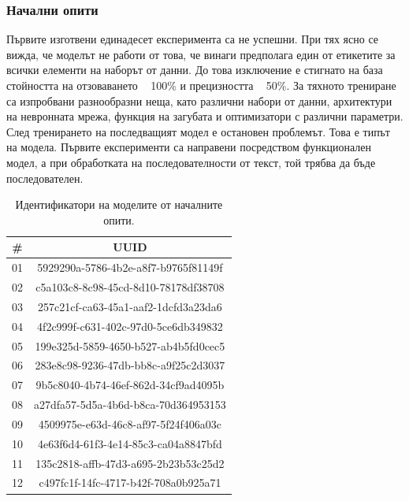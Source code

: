 \documentclass{article}
\begin{document}
\subsubsection{Начални опити}

Първите изготвени единадесет експеримента са не успешни. При тях ясно се вижда, че моделът не работи от това, че винаги
предполага един от етикетите за всички елементи на наборът от данни. До това изключение е стигнато на база стойността
на отзоваването ~ 100\% и прецизността ~ 50\%. За тяхното трениране са изпробвани разнообразни неща, като различни
набори от данни, архитектури на невронната мрежа, функция на загубата и оптимизатори с различни параметри. След
тренирането на последващият модел е остановен проблемът. Това е типът на модела. Първите експерименти са направени
посредством функционален модел, а при обработката на последователности от текст, той трябва да бъде последователен.

\begin{table}[H]
\centering
\captionsetup{justification=centering}
\begin{tabular}{|c||c|}
\hline
\# & UUID\\
\hline
01 & 5929290a-5786-4b2e-a8f7-b9765f81149f\\
02 & c5a103c8-8c98-45cd-8d10-78178df38708\\
03 & 257c21cf-ca63-45a1-aaf2-1dcfd3a23da6\\
04 & 4f2c999f-c631-402c-97d0-5ce6db349832\\
05 & 199e325d-5859-4650-b527-ab4b5fd0cec5\\
06 & 283e8c98-9236-47db-bb8c-a9f25c2d3037\\
07 & 9b5c8040-4b74-46ef-862d-34cf9ad4095b\\
08 & a27dfa57-5d5a-4b6d-b8ca-70d364953153\\
09 & 4509975e-e63d-46c8-af97-5f24f406a03c\\
10 & 4e63f6d4-61f3-4e14-85c3-ca04a8847bfd\\
11 & 135c2818-affb-47d3-a695-2b23b53c25d2\\
12 & c497fc1f-14fc-4717-b42f-708a0b925a71\\
\hline
\end{tabular}
\caption{Идентификатори на моделите от началните опити.}
\end{table}
\end{document}
